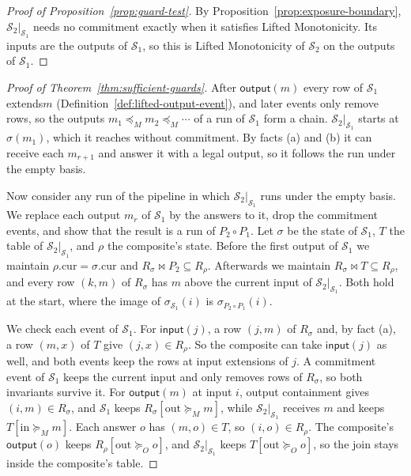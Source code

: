 \documentclass[sigconf]{cidr-2027}
\theoremstyle{remark}
\newcommand{\OutputGe}{\succeq_O}
\newcommand{\commitment}{commitment\xspace}
\newcommand{\indescs}{input extensions\xspace}
\newcommand{\outrel}{extends\xspace}          %
\newcommand{\Spec}{\mathcal{S}}
\begin{document}
\begin{proof}[Proof of Proposition~\ref{prop:guard-test}]
By Proposition~\ref{prop:exposure-boundary}, $\Spec_2|_{\Spec_1}$ needs
no \commitment exactly when it satisfies Lifted Monotonicity. Its inputs are
the outputs of $\Spec_1$, so this is Lifted Monotonicity of $\Spec_2$ on the
outputs of $\Spec_1$.
\end{proof}

\begin{proof}[Proof of Theorem~\ref{thm:sufficient-guards}]
After $\mathsf{output}(m)$ every row of $\Spec_1$ \outrel $m$
(Definition~\ref{def:lifted-output-event}), and later events only remove
rows, so the outputs $m_1\preceq_M m_2\preceq_M\cdots$ of a run of $\Spec_1$
form a chain. $\Spec_2|_{\Spec_1}$ starts at $\sigma(m_1)$, which it reaches
without \commitment. By facts (a) and (b) it can receive each $m_{r+1}$ and
answer it with a legal output, so it follows the run under the empty basis.

Now consider any run of the pipeline in which $\Spec_2|_{\Spec_1}$ runs under
the empty basis. We replace each output $m_r$ of $\Spec_1$ by the answers to
it, drop the \commitment events, and show that the result is a run of
$P_2\circ P_1$. Let $\sigma$ be the state of $\Spec_1$, $T$ the table of
$\Spec_2|_{\Spec_1}$, and $\rho$ the composite's state. Before the first
output of $\Spec_1$ we maintain $\rho.\mathrm{cur}=\sigma.\mathrm{cur}$ and
$R_\sigma\Join P_2\subseteq R_\rho$. Afterwards we maintain $R_\sigma\Join
T\subseteq R_\rho$, and every row $(k,m)$ of $R_\sigma$ has $m$ above the
current input of $\Spec_2|_{\Spec_1}$. Both hold at the start, where the
image of $\sigma_{\Spec_1}(i)$ is $\sigma_{P_2\circ P_1}(i)$.

We check each event of $\Spec_1$. For $\mathsf{input}(j)$, a row $(j,m)$ of
$R_\sigma$ and, by fact (a), a row $(m,x)$ of $T$ give $(j,x)\in R_\rho$. So
the composite can take $\mathsf{input}(j)$ as well, and both events keep the
rows at \indescs of $j$. A \commitment event of $\Spec_1$ keeps the current
input and only removes rows of $R_\sigma$, so both invariants survive it. For
$\mathsf{output}(m)$ at input $i$, output containment gives $(i,m)\in
R_\sigma$, and $\Spec_1$ keeps $R_\sigma[\mathrm{out}\succeq_M m]$, while
$\Spec_2|_{\Spec_1}$ receives $m$ and keeps $T[\mathrm{in}\succeq_M m]$. Each
answer $o$ has $(m,o)\in T$, so $(i,o)\in R_\rho$. The composite's
$\mathsf{output}(o)$ keeps $R_\rho[\mathrm{out}\OutputGe o]$, and
$\Spec_2|_{\Spec_1}$ keeps $T[\mathrm{out}\OutputGe o]$, so the join stays
inside the composite's table.


\end{proof}
\end{document}
